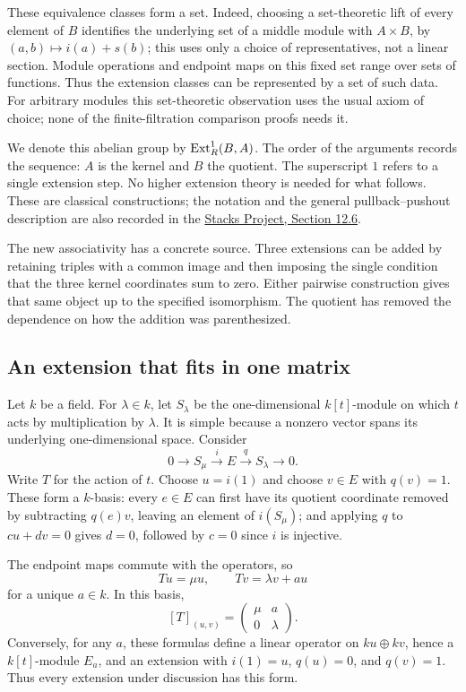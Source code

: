 These equivalence classes form a set. Indeed, choosing a set-theoretic
lift of every element of $B$ identifies the underlying set of a middle
module with $A\times B$, by $(a,b)\mapsto i(a)+s(b)$; this uses only
a choice of representatives, not a linear section. Module operations
and endpoint maps on this fixed set range over sets of functions.
Thus the extension classes can be represented by a set of such data.
For arbitrary modules this set-theoretic observation uses the usual
axiom of choice; none of the finite-filtration comparison proofs needs it.

We denote this abelian group by $\operatorname{Ext}^1_R(B,A)$. The order of the
arguments records the sequence: $A$ is the kernel and $B$ the quotient.
The superscript $1$ refers to a single extension step. No higher
extension theory is needed for what follows. These are classical
constructions; the notation and the general pullback--pushout description
are also recorded in the \href{https://stacks.math.columbia.edu/tag/010I}
{Stacks Project, Section 12.6}.

The new associativity has a concrete source. Three extensions can be
added by retaining triples with a common image and then imposing the
single condition that the three kernel coordinates sum to zero. Either
pairwise construction gives that same object up to the specified
isomorphism. The quotient has removed the dependence on how the addition
was parenthesized.

\subsection{An extension that fits in one matrix}\label{x:operator-extensions}

Let $k$ be a field. For $\lambda\in k$, let $S_\lambda$ be the
one-dimensional $k[t]$-module on which $t$ acts by multiplication by
$\lambda$. It is simple because a nonzero vector spans its underlying
one-dimensional space. Consider
\[
0\longrightarrow S_\mu\xrightarrow{i}E\xrightarrow{q}S_\lambda
\longrightarrow0.
\]
Write $T$ for the action of $t$. Choose $u=i(1)$ and choose $v\in E$
with $q(v)=1$. These form a $k$-basis: every $e\in E$ can first have its
quotient coordinate removed by subtracting $q(e)v$, leaving an element
of $i(S_\mu)$; and applying $q$ to $cu+dv=0$ gives $d=0$, followed by
$c=0$ since $i$ is injective.

The endpoint maps commute with the operators, so
\[
Tu=\mu u,\qquad Tv=\lambda v+a u
\]
for a unique $a\in k$. In this basis,
\[
[T]_{(u,v)}=\begin{pmatrix}\mu&a\\0&\lambda\end{pmatrix}.
\]
Conversely, for any $a$, these formulas define a linear operator on
$ku\oplus kv$, hence a $k[t]$-module $E_a$, and an extension with
$i(1)=u$, $q(u)=0$, and $q(v)=1$. Thus every extension under discussion
has this form.

